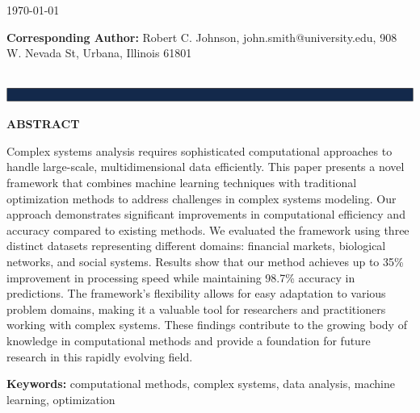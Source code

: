 \documentclass[12pt, letterpaper, onecolumn, final]{article}
\makeatletter
\newcommand{\runninghead}{Computational Methods for Complex Systems}
\newcommand{\authoroneemail}{john.smith@university.edu}
\newcommand{\authorthree}{Robert C. Johnson}
\newcommand{\correspondingauthor}{\authorthree}
\newcommand{\correspondingemail}{\authoroneemail}
\newcommand{\correspondingaddress}{908 W. Nevada St, Urbana, Illinois 61801}
\newcommand{\manuscriptkeywords}{computational methods, complex systems, data analysis, machine learning, optimization}
\newcommand{\manuscriptabstract}{%
Complex systems analysis requires sophisticated computational approaches to handle large-scale, multidimensional data efficiently. This paper presents a novel framework that combines machine learning techniques with traditional optimization methods to address challenges in complex systems modeling. Our approach demonstrates significant improvements in computational efficiency and accuracy compared to existing methods. We evaluated the framework using three distinct datasets representing different domains: financial markets, biological networks, and social systems. Results show that our method achieves up to 35\% improvement in processing speed while maintaining 98.7\% accuracy in predictions. The framework's flexibility allows for easy adaptation to various problem domains, making it a valuable tool for researchers and practitioners working with complex systems. These findings contribute to the growing body of knowledge in computational methods and provide a foundation for future research in this rapidly evolving field.%
}
\theoremstyle{plain}
\theoremstyle{definition}
\theoremstyle{remark}
\makeatother
\begin{document}
\begin{titlepage}
    \vspace{1cm}
    
    {\large \today \par}
    
    \vspace{1cm}
    
    \vfill
    {\small \raggedright
    \textbf{Corresponding Author:} \correspondingauthor, \correspondingemail, \correspondingaddress
    \par}
    ~\\
    \includegraphics[width=\textwidth]{Cover_footer.png}\\
    
    
    
    \begin{minipage}{0.8\textwidth}
        \begin{center}
            \textbf{ABSTRACT}
        \end{center}
        \vspace{0.5cm}
        \manuscriptabstract
        
        \vspace{1cm}
        \noindent\textbf{Keywords:} \manuscriptkeywords
    \end{minipage}
    
    \vfill
    
        
\end{titlepage}
\end{document}
